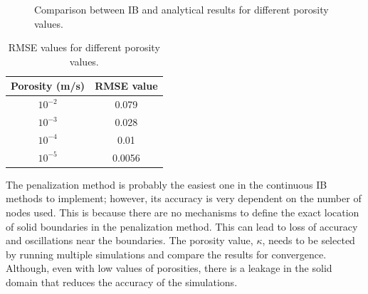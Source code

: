 \begin{figure}[H]
{    }
    \quad
    \caption{Comparison between IB and analytical results for different porosity values.}
    \label{fig:C3_penalizationResultPorosity}
\end{figure}

\begin{table}[H]
\centering
\begin{tabular}{c | c}
    Porosity (m/s) & RMSE value \\ \hline \hline
    $10^{-2}$ & 0.079 \\ \hline
    $10^{-3}$ & 0.028 \\ \hline
    $10^{-4}$ & 0.01 \\ \hline
    $10^{-5}$ & 0.0056
\end{tabular}
\caption{RMSE values for different porosity values.}
\label{table:C3_penalizationResultPorosityRMSE}
\end{table}

The penalization method is probably the easiest one in the continuous IB methods to implement; however, its accuracy is very dependent on the number of nodes used. This is because there are no mechanisms to define the exact location of solid boundaries in the penalization method. This can lead to loss of accuracy and oscillations near the boundaries. The porosity value, $\kappa$, needs to be selected by running multiple simulations and compare the results for convergence. Although, even with low values of porosities, there is a leakage in the solid domain that reduces the accuracy of the simulations.